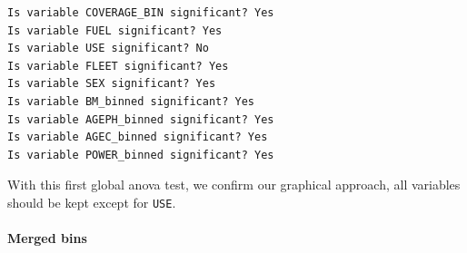 \documentclass[
  english,
  11pt,
]{article}
\newenvironment{Shaded}{\begin{snugshade}}{\end{snugshade}}
\newcommand{\AttributeTok}[1]{\textcolor[rgb]{0.13,0.29,0.53}{#1}}
\newcommand{\ControlFlowTok}[1]{\textcolor[rgb]{0.13,0.29,0.53}{\textbf{#1}}}
\newcommand{\DecValTok}[1]{\textcolor[rgb]{0.00,0.00,0.81}{#1}}
\newcommand{\FloatTok}[1]{\textcolor[rgb]{0.00,0.00,0.81}{#1}}
\newcommand{\FunctionTok}[1]{\textcolor[rgb]{0.13,0.29,0.53}{\textbf{#1}}}
\newcommand{\NormalTok}[1]{#1}
\newcommand{\OtherTok}[1]{\textcolor[rgb]{0.56,0.35,0.01}{#1}}
\newcommand{\SpecialCharTok}[1]{\textcolor[rgb]{0.81,0.36,0.00}{\textbf{#1}}}
\newcommand{\StringTok}[1]{\textcolor[rgb]{0.31,0.60,0.02}{#1}}
\begin{document}
\begin{Shaded}
\end{Shaded}

\begin{verbatim}
Is variable COVERAGE_BIN significant? Yes
Is variable FUEL significant? Yes
Is variable USE significant? No
Is variable FLEET significant? Yes
Is variable SEX significant? Yes
Is variable BM_binned significant? Yes
Is variable AGEPH_binned significant? Yes
Is variable AGEC_binned significant? Yes
Is variable POWER_binned significant? Yes
\end{verbatim}

With this first global anova test, we confirm our graphical approach,
all variables should be kept except for \texttt{USE}.

\paragraph{Merged bins}\label{merged-bins}
\end{document}
